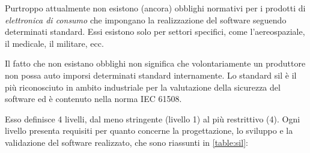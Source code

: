\documentclass[12pt,a4paper,twoside,titlepage]{book}
\begin{document}
Purtroppo attualmente non esistono (ancora) obblighi normativi per 
i prodotti di \textit{elettronica di consumo} che impongano la realizzazione del software seguendo determinati 
standard. Essi esistono solo per settori specifici, come l'aereospaziale, il medicale, il militare, ecc. 

Il fatto che non esistano obblighi non significa che volontariamente un produttore non possa auto imporsi determinati 
standard internamente. Lo standard \acrfull{sil} è il più riconosciuto in ambito industriale per la valutazione 
della sicurezza del software ed è contenuto nella norma IEC 61508. 

Esso definisce 4 livelli, dal meno stringente (livello 1) al più restrittivo (4). Ogni 
livello presenta requisiti per quanto concerne la progettazione, lo sviluppo e la validazione 
del software realizzato, che sono riassunti in \autoref{table:sil}:
\end{document}
